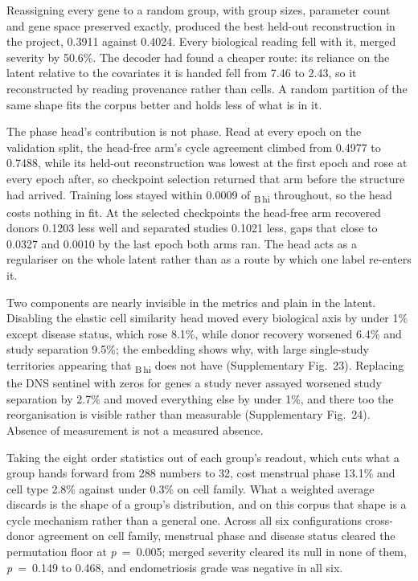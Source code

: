 Reassigning every gene to a random group, with group sizes, parameter count
and gene space preserved exactly, produced the best held-out reconstruction
in the project, 0.3911 against 0.4024. Every biological reading fell with
it, merged severity by 50.6\%. The decoder had found a cheaper route: its
reliance on the latent relative to the covariates it is handed fell from
7.46 to 2.43, so it reconstructed by reading provenance rather than cells.
A random partition of the same shape fits the corpus better and holds less
of what is in it.

The phase head's contribution is not phase. Read at every epoch on the
validation split, the head-free arm's cycle agreement climbed from 0.4977 to
0.7488, while its held-out reconstruction was lowest at the first epoch and
rose at every epoch after, so checkpoint selection returned that arm before
the structure had arrived. Training loss stayed within 0.0009 of
\elaj\textsubscript{B\,hi} throughout, so the head costs nothing in fit. At the selected
checkpoints the head-free arm recovered donors 0.1203 less well and separated
studies 0.1021 less, gaps that close to 0.0327 and 0.0010 by the last epoch
both arms ran. The head acts as a regulariser on the whole latent rather
than as a route by which one label re-enters it.

Two components are nearly invisible in the metrics and plain in the latent.
Disabling the elastic cell similarity head moved every biological axis by
under 1\% except disease status, which rose 8.1\%, while donor recovery
worsened 6.4\% and study separation 9.5\%; the embedding shows why, with
large single-study territories appearing that \elaj\textsubscript{B\,hi} does not have
(Supplementary Fig.~23). Replacing the DNS sentinel with zeros for genes a study never
assayed worsened study separation by 2.7\% and moved everything else by
under 1\%, and there too the reorganisation is visible rather than
measurable (Supplementary Fig.~24). Absence of measurement is not a measured absence.

Taking the eight order statistics out of each group's readout, which cuts
what a group hands forward from 288 numbers to 32, cost menstrual phase
13.1\% and cell type 2.8\% against under 0.3\% on cell family. What a
weighted average discards is the shape of a group's distribution, and on
this corpus that shape is a cycle mechanism rather than a general one.
Across all six configurations cross-donor agreement on cell family,
menstrual phase and disease status cleared the permutation floor at
\textit{p}~=~0.005; merged severity cleared its null in none of them, \textit{p}~=~0.149
to 0.468, and endometriosis grade was negative in all six.


